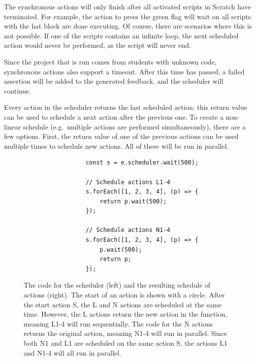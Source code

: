 \documentclass[../main]{subfiles}
\begin{document}
The synchronous actions will only finish after all activated scripts in Scratch have terminated.
For example, the action to press the green flag will wait on all scripts with the hat block  are done executing.
Of course, there are scenarios where this is not possible.
If one of the scripts contains an infinite loop, the next scheduled action would never be performed, as the script will never end.

Since the project that is run comes from students with unknown code, synchronous actions also support a timeout.
After this time has passed, a failed assertion will be added to the generated feedback, and the scheduler will continue.

Every action in the scheduler returns the last scheduled action: this return value can be used to schedule a next action after the previous one.
To create a non-linear schedule (e.g.\ multiple actions are performed simultaneously), there are a few options.
First, the return value of one of the previous actions can be used multiple times to schedule new actions.
All of these will be run in parallel.

\begin{figure}
    \begin{subfigure}{0.49\linewidth}
        \centering
        \begin{verbatim}
            const s = e.scheduler.wait(500);

            // Schedule actions L1-4
            s.forEach([1, 2, 3, 4], (p) => {
                return p.wait(500);
            });

            // Schedule actions N1-4
            s.forEach([1, 2, 3, 4], (p) => {
                p.wait(500);
                return p;
            });
        \end{verbatim}
    \end{subfigure}
    \begin{subfigure}{0.49\linewidth}
        \centering
        
    \end{subfigure}
    \caption{
        The code for the scheduler (left) and the resulting schedule of actions (right).
        The start of an action is shown with a circle.
        After the start action S, the L and N actions are scheduled at the same time.
        However, the L actions return the new action in the function, meaning L1-4 will run sequentially.
        The code for the N actions returns the original action, meaning N1-4 will run in parallel.
        Since both N1 and L1 are scheduled on the same action S, the actions L1 and N1-4 will all run in parallel.
    }
    \label{fig:itch-scheduler-schedule}
\end{figure}
\end{document}
